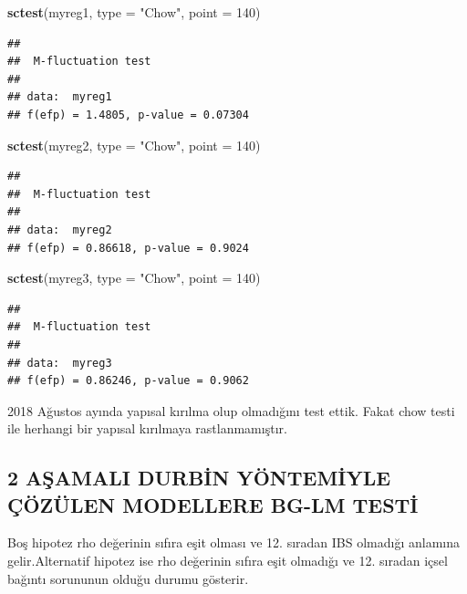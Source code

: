 \documentclass[]{article}
\newenvironment{Shaded}{\begin{snugshade}}{\end{snugshade}}
\newcommand{\KeywordTok}[1]{\textcolor[rgb]{0.13,0.29,0.53}{\textbf{#1}}}
\newcommand{\DataTypeTok}[1]{\textcolor[rgb]{0.13,0.29,0.53}{#1}}
\newcommand{\DecValTok}[1]{\textcolor[rgb]{0.00,0.00,0.81}{#1}}
\newcommand{\StringTok}[1]{\textcolor[rgb]{0.31,0.60,0.02}{#1}}
\newcommand{\NormalTok}[1]{#1}
\begin{document}
\begin{Shaded}
\begin{Highlighting}[]
\KeywordTok{sctest}\NormalTok{(myreg1, }\DataTypeTok{type =} \StringTok{"Chow"}\NormalTok{, }\DataTypeTok{point =} \DecValTok{140}\NormalTok{)}
\end{Highlighting}
\end{Shaded}

\begin{verbatim}
## 
##  M-fluctuation test
## 
## data:  myreg1
## f(efp) = 1.4805, p-value = 0.07304
\end{verbatim}

\begin{Shaded}
\begin{Highlighting}[]
\KeywordTok{sctest}\NormalTok{(myreg2, }\DataTypeTok{type =} \StringTok{"Chow"}\NormalTok{, }\DataTypeTok{point =} \DecValTok{140}\NormalTok{)}
\end{Highlighting}
\end{Shaded}

\begin{verbatim}
## 
##  M-fluctuation test
## 
## data:  myreg2
## f(efp) = 0.86618, p-value = 0.9024
\end{verbatim}

\begin{Shaded}
\begin{Highlighting}[]
\KeywordTok{sctest}\NormalTok{(myreg3, }\DataTypeTok{type =} \StringTok{"Chow"}\NormalTok{, }\DataTypeTok{point =} \DecValTok{140}\NormalTok{)}
\end{Highlighting}
\end{Shaded}

\begin{verbatim}
## 
##  M-fluctuation test
## 
## data:  myreg3
## f(efp) = 0.86246, p-value = 0.9062
\end{verbatim}

2018 Ağustos ayında yapısal kırılma olup olmadığını test ettik. Fakat
chow testi ile herhangi bir yapısal kırılmaya rastlanmamıştır.

\subsection{2 AŞAMALI DURBİN YÖNTEMİYLE ÇÖZÜLEN MODELLERE BG-LM
TESTİ}\label{asamali-durbin-yontemiyle-cozulen-modellere-bg-lm-testi}

Boş hipotez rho değerinin sıfıra eşit olması ve 12. sıradan IBS olmadığı
anlamına gelir.Alternatif hipotez ise rho değerinin sıfıra eşit olmadığı
ve 12. sıradan içsel bağıntı sorununun olduğu durumu gösterir.
\end{document}
